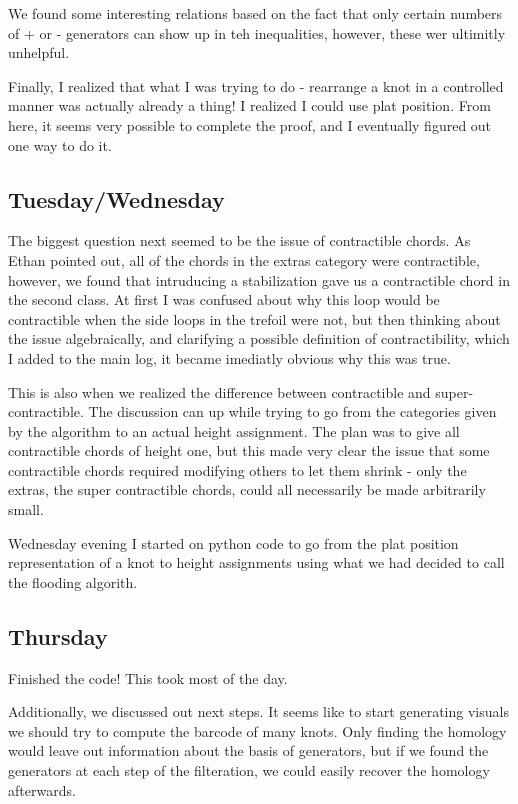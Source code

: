 \documentclass[11pt,oneside]{amsart}
\begin{document}
We found some interesting relations based on the fact that only certain numbers of + or - generators can show up in teh inequalities, however, these wer ultimitly unhelpful.

Finally, I realized that what I was trying to do - rearrange a knot in a controlled manner was actually already a thing! I realized I could use plat position. From here, it seems very possible to complete the proof, and I eventually figured out one way to do it.


\subsection{Tuesday/Wednesday}

The biggest question next seemed to be the issue of contractible chords. As Ethan pointed out, all of the chords in the extras category were contractible, however, we found that intruducing a stabilization gave us a contractible chord in the second class. At first I was confused about why this loop would be contractible when the side loops in the trefoil were not, but then thinking about the issue algebraically, and clarifying a possible definition of contractibility, which I added to the main log, it became imediatly obvious why this was true. 

This is also when we realized the difference between contractible and super-contractible. The discussion can up while trying to go from the categories given by the algorithm to an actual height assignment. The plan was to give all contractible chords of height one, but this made very clear the issue that some contractible chords required modifying others to let them shrink - only the extras, the super contractible chords, could all necessarily be made arbitrarily small. 

Wednesday evening I started on python code to go from the plat position representation of a knot to height assignments using what we had decided to call the flooding algorith.


\subsection{Thursday}

Finished the code! This took most of the day. 

Additionally, we discussed out next steps. It seems like to start generating visuals we should try to compute the barcode of many knots. Only finding the homology would leave out information about the basis of generators, but if we found the generators at each step of the filteration, we could easily recover the homology afterwards.
\end{document}
